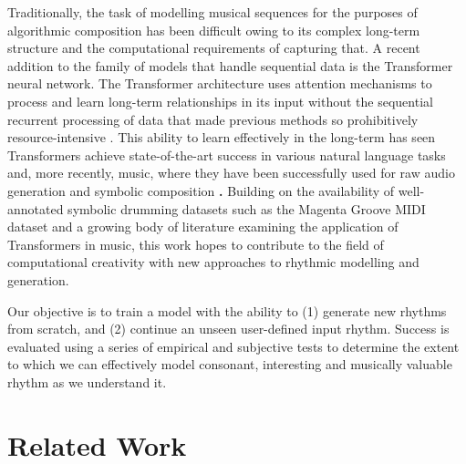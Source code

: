 \documentclass[sigconf]{nimeart}
\begin{document}
Traditionally, the task of modelling musical sequences for the purposes of algorithmic composition has been difficult owing to its complex long-term structure and the computational requirements of capturing that. A recent addition to the family of models that handle sequential data is the Transformer neural network. The Transformer architecture uses attention mechanisms to process and learn long-term relationships in its input without the sequential recurrent processing of data that made previous methods so prohibitively resource-intensive \cite{c1,c2}. This ability to learn effectively in the long-term has seen Transformers achieve state-of-the-art success in various natural language tasks \cite{c3,c4,c5} and, more recently, music, where they have been successfully used for raw audio generation \cite{c6} and symbolic composition \cite{c7,c8}\textbf{.} Building on the availability of well-annotated symbolic drumming datasets such as the Magenta Groove MIDI dataset \cite{c9} and a growing body of literature examining the application of Transformers in music, this work hopes to contribute to the field of computational creativity with new approaches to rhythmic modelling and generation.

Our objective is to train a model with the ability to (1) generate new rhythms from scratch, and (2) continue an unseen user-defined input rhythm. Success is evaluated using a series of empirical and subjective tests to determine the extent to which we can effectively model consonant, interesting and musically valuable rhythm as we understand it.

\section{Related Work}\label{related-work}
\end{document}
